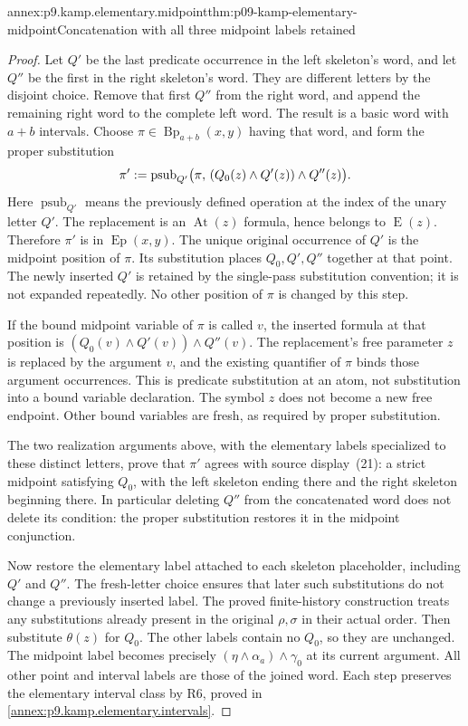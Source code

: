 \begin{annexitem}{annex:p9.kamp.elementary.midpoint}{thm:p09-kamp-elementary-midpoint}{Concatenation with all three midpoint labels retained}
\begin{proof}
Let \(Q'\) be the last predicate occurrence in the left skeleton's
word, and let \(Q''\) be the first in the right skeleton's word.
They are different letters by the disjoint choice. Remove that first
\(Q''\) from the right word, and append the remaining right word
to the complete left word. The result is a basic word with \(a+b\)
intervals. Choose \(\pi\in\operatorname{Bp}_{a+b}(x,y)\) having
that word, and form the proper substitution
\[
 \pi'\mathrel{:=}
 \operatorname{psub}_{Q'}
   \bigl(\pi,\,(Q_0(z)\land Q'(z))\land Q''(z)\bigr).
\]
Here \(\operatorname{psub}_{Q'}\) means the previously defined
operation at the index of the unary letter \(Q'\).
The replacement is an \(\operatorname{At}(z)\) formula, hence belongs
to \(\operatorname{E}(z)\). Therefore \(\pi'\) is in
\(\operatorname{Ep}(x,y)\). The unique original occurrence of
\(Q'\) is the midpoint position of \(\pi\). Its substitution
places \(Q_0,Q',Q''\) together at that point. The newly inserted
\(Q'\) is retained by the single-pass substitution convention;
it is not expanded repeatedly. No other position of \(\pi\) is
changed by this step.

If the bound midpoint variable of \(\pi\) is called \(v\), the
inserted formula at that position is
\((Q_0(v)\land Q'(v))\land Q''(v)\). The replacement's free
parameter \(z\) is replaced by the argument \(v\), and the existing
quantifier of \(\pi\) binds those argument occurrences. This is
predicate substitution at an atom, not substitution into a bound
variable declaration. The symbol \(z\) does not become a new free
endpoint. Other bound variables are fresh, as required by proper
substitution.

The two realization arguments above, with the elementary labels
specialized to these distinct letters, prove that \(\pi'\) agrees
with source display~(21): a strict midpoint satisfying \(Q_0\),
with the left skeleton ending there and the right skeleton beginning
there. In particular deleting \(Q''\) from the concatenated word
does not delete its condition: the proper substitution restores it
in the midpoint conjunction.

Now restore the elementary label attached to each skeleton placeholder,
including \(Q'\) and \(Q''\). The fresh-letter choice ensures
that later such substitutions do not change a previously inserted
label. The proved finite-history construction treats any substitutions
already present in the original \(\rho,\sigma\) in their actual
order. Then substitute \(\theta(z)\) for \(Q_0\).
The other labels contain no \(Q_0\), so they are unchanged.
The midpoint label becomes precisely
\((\eta\land\alpha_a)\land\gamma_0\) at its current argument.
All other point and interval labels are those of the joined word.
Each step preserves the elementary interval class by R6, proved in
\cref{annex:p9.kamp.elementary.intervals}.


\end{proof}
\end{annexitem}
